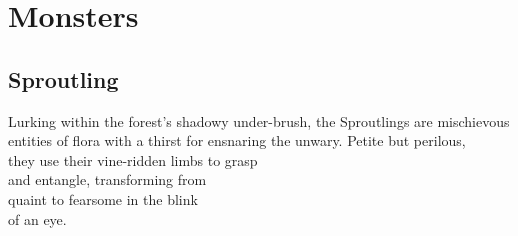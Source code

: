 \chapter{Monsters}
\section*{Sproutling}\label{sec:Sproutling}
Lurking within the forest's shadowy under-brush, the Sproutlings are mischievous entities of flora with a thirst for ensnaring the unwary. Petite but perilous,\\they use their vine-ridden limbs to grasp\\and entangle, transforming from\\quaint to fearsome in the blink\\of an eye.
